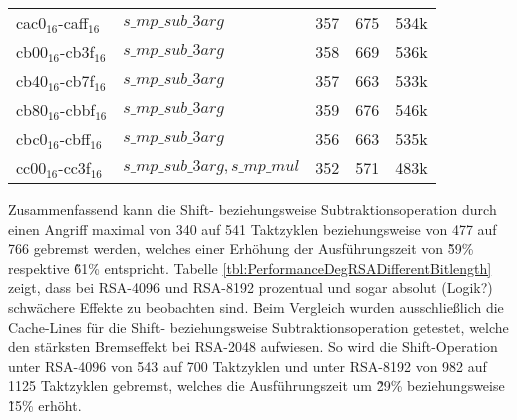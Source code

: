 \begin{table}[h]
\begin{tabular}{lllll}
cac0$_{16}$-caff$_{16}$  & $s\_mp\_sub\_3arg$             & 357   & 675         & 534k    \\
cb00$_{16}$-cb3f$_{16}$  & $s\_mp\_sub\_3arg$            & 358   & 669         & 536k    \\
cb40$_{16}$-cb7f$_{16}$  & $s\_mp\_sub\_3arg$             & 357   & 663         & 533k    \\
cb80$_{16}$-cbbf$_{16}$  & $s\_mp\_sub\_3arg$             & 359   & 676         & 546k    \\
cbc0$_{16}$-cbff$_{16}$  & $s\_mp\_sub\_3arg$             & 356   & 663         & 535k    \\
cc00$_{16}$-cc3f$_{16}$  & $s\_mp\_sub\_3arg, s\_mp\_mul$ & 352   & 571         & 483k   
\end{tabular}
\end{table}


Zusammenfassend kann die Shift- beziehungsweise Subtraktionsoperation durch einen Angriff maximal von 340 auf 541 Taktzyklen beziehungsweise von 477 auf 766 gebremst werden, welches einer Erhöhung der Ausführungszeit von \~59\% respektive \~61\% entspricht.
Tabelle \ref{tbl:PerformanceDegRSADifferentBitlength} zeigt, dass bei RSA-4096 und RSA-8192 prozentual und sogar absolut (Logik?) schwächere Effekte zu beobachten sind.
Beim Vergleich wurden ausschließlich die Cache-Lines für die Shift- beziehungsweise Subtraktionsoperation getestet, welche den stärksten Bremseffekt bei RSA-2048 aufwiesen.
So wird die Shift-Operation unter RSA-4096 von 543 auf 700 Taktzyklen und unter RSA-8192 von 982 auf 1125 Taktzyklen gebremst, welches die Ausführungszeit um \~29\% beziehungsweise \~15\% erhöht.

